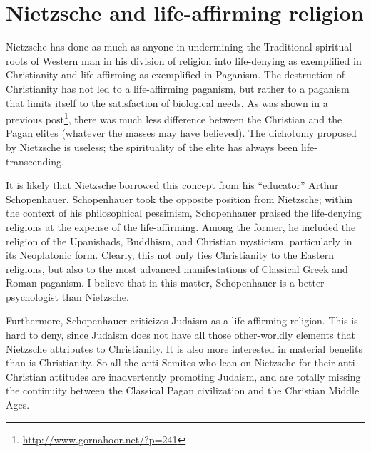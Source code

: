 \section{Nietzsche and life-affirming religion}

Nietzsche has done as much as anyone in undermining the Traditional spiritual roots of Western man in his division of religion into life-denying as exemplified in Christianity and life-affirming as exemplified in Paganism. The destruction of Christianity has not led to a life-affirming paganism, but rather to a paganism that limits itself to the satisfaction of biological needs. As was shown in a previous post\footnote{\url{http://www.gornahoor.net/?p=241}}, there was much less difference between the Christian and the Pagan elites (whatever the masses may have believed). The dichotomy proposed by Nietzsche is useless; the spirituality of the elite has always been life-transcending.

It is likely that Nietzsche borrowed this concept from his ``educator'' Arthur Schopenhauer. Schopenhauer took the opposite position from Nietzsche; within the context of his philosophical pessimism, Schopenhauer praised the life-denying religions at the expense of the life-affirming. Among the former, he included the religion of the Upanishads, Buddhism, and Christian mysticism, particularly in its Neoplatonic form. Clearly, this not only ties Christianity to the Eastern religions, but also to the most advanced manifestations of Classical Greek and Roman paganism. I believe that in this matter, Schopenhauer is a better psychologist than Nietzsche.

Furthermore, Schopenhauer criticizes Judaism as a life-affirming religion. This is hard to deny, since Judaism does not have all those other-worldly elements that Nietzsche attributes to Christianity. It is also more interested in material benefits than is Christianity. So all the anti-Semites who lean on Nietzsche for their anti-Christian attitudes are inadvertently promoting Judaism, and are totally missing the continuity between the Classical Pagan civilization and the Christian Middle Ages.



